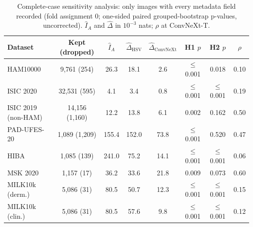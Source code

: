 \begin{table}[tp]\centering\footnotesize
\caption{Complete-case sensitivity analysis: only images with every metadata field recorded (fold assignment 0; one-sided paired grouped-bootstrap p-values, uncorrected). $\hat I_A$ and $\hat\Delta$ in $10^{-3}$ nats; $\rho$ at ConvNeXt-T.}\label{tab:cc}
\begin{tabular}{lccccccc}\toprule
Dataset & Kept (dropped) & $\hat I_A$ & $\hat\Delta_{\mathrm{HSV}}$ & $\hat\Delta_{\mathrm{ConvNeXt}}$ & H1 $p$ & H2 $p$ & $\rho$\\\midrule
HAM10000 & 9{,}761 (254) & 26.3 & 18.1 & 2.6 & $\le$0.001 & 0.018 & 0.10\\
ISIC 2020 & 32{,}531 (595) & 4.1 & 3.4 & 0.8 & $\le$0.001 & $\le$0.001 & 0.19\\
ISIC 2019 (non-HAM) & 14{,}156 (1{,}160) & 12.2 & 13.8 & 6.1 & 0.002 & 0.162 & 0.50\\
PAD-UFES-20 & 1{,}089 (1{,}209) & 155.4 & 152.0 & 73.8 & $\le$0.001 & 0.520 & 0.47\\
HIBA & 1{,}085 (139) & 241.0 & 75.2 & 14.1 & $\le$0.001 & $\le$0.001 & 0.06\\
MSK 2020 & 1{,}157 (17) & 36.2 & 33.6 & 21.8 & 0.009 & 0.073 & 0.60\\
MILK10k (derm.) & 5{,}086 (31) & 80.5 & 50.7 & 12.3 & $\le$0.001 & $\le$0.001 & 0.15\\
MILK10k (clin.) & 5{,}086 (31) & 80.5 & 57.6 & 9.8 & $\le$0.001 & $\le$0.001 & 0.12\\
\bottomrule\end{tabular}\end{table}

